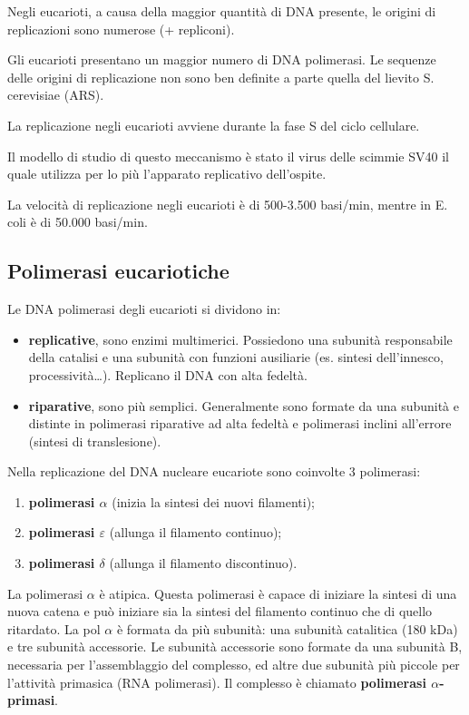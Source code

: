 \documentclass[11pt]{book}
\begin{document}
Negli eucarioti, a causa della maggior quantità di DNA presente, le
origini di replicazioni sono numerose (+ repliconi).

Gli eucarioti presentano un maggior numero di DNA polimerasi. Le
sequenze delle origini di replicazione non sono ben definite a parte
quella del lievito S. cerevisiae (ARS).

La replicazione negli eucarioti avviene durante la fase S del ciclo
cellulare.

Il modello di studio di questo meccanismo è stato il virus delle scimmie
SV40 il quale utilizza per lo più l'apparato replicativo dell'ospite.

La velocità di replicazione negli eucarioti è di 500-3.500 basi/min,
mentre in E. coli è di 50.000 basi/min.

\subsection{Polimerasi eucariotiche}\label{polimerasi-eucariotiche}

Le DNA polimerasi degli eucarioti si dividono in:

\begin{itemize}
\itemsep1pt\parskip0pt
\item
  \textbf{replicative}, sono enzimi multimerici. Possiedono una subunità
  responsabile della catalisi e una subunità con funzioni ausiliarie
  (es. sintesi dell'innesco, processività\ldots{}). Replicano il DNA con
  alta fedeltà.
\item
  \textbf{riparative}, sono più semplici. Generalmente sono formate da
  una subunità e distinte in polimerasi riparative ad alta fedeltà e
  polimerasi inclini all'errore (sintesi di translesione).
\end{itemize}

Nella replicazione del DNA nucleare eucariote sono coinvolte 3
polimerasi:

\begin{enumerate}
\def\labelenumi{\arabic{enumi}.}
\itemsep1pt\parskip0pt
\item
  \textbf{polimerasi \(\alpha\)} (inizia la sintesi dei nuovi
  filamenti);
\item
  \textbf{polimerasi \(\varepsilon\)} (allunga il filamento continuo);
\item
  \textbf{polimerasi \(\delta\)} (allunga il filamento discontinuo).
\end{enumerate}

La polimerasi \(\alpha\) è atipica. Questa polimerasi è capace di
iniziare la sintesi di una nuova catena e può iniziare sia la sintesi
del filamento continuo che di quello ritardato. La pol \(\alpha\) è
formata da più subunità: una subunità catalitica (180 kDa) e tre
subunità accessorie. Le subunità accessorie sono formate da una subunità
B, necessaria per l'assemblaggio del complesso, ed altre due subunità
più piccole per l'attività primasica (RNA polimerasi). Il complesso è
chiamato \textbf{polimerasi \(\alpha\)-primasi}.
\end{document}
